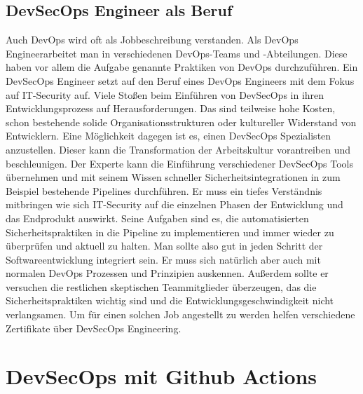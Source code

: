 \section{DevSecOps Engineer als Beruf}
Auch DevOps wird oft als Jobbeschreibung verstanden. Als \glqq DevOps Engineer\grqq arbeitet man in verschiedenen DevOps-Teams und -Abteilungen. Diese haben vor allem die Aufgabe genannte Praktiken von DevOps durchzuführen. \cite{dev-ops}
Ein DevSecOps Engineer setzt auf den Beruf eines DevOps Engineers mit dem Fokus auf IT-Security auf.
Viele Stoßen beim Einführen von DevSecOps in ihren Entwicklungsprozess auf Herausforderungen. Das sind teilweise hohe Kosten, schon bestehende solide Organisationsstrukturen oder kultureller Widerstand von Entwicklern. Eine Möglichkeit dagegen ist es, einen DevSecOps Spezialisten anzustellen. Dieser kann die Transformation der Arbeitskultur vorantreiben und beschleunigen. Der Experte kann die Einführung verschiedener DevSecOps Tools übernehmen und mit seinem Wissen schneller Sicherheitsintegrationen in zum Beispiel bestehende Pipelines durchführen. \cite{grey}
Er muss ein tiefes Verständnis mitbringen wie sich IT-Security auf die einzelnen Phasen der Entwicklung und das Endprodukt auswirkt. Seine Aufgaben sind es, die automatisierten Sicherheitspraktiken in die Pipeline zu implementieren und immer wieder zu überprüfen und aktuell zu halten. Man sollte also gut in jeden Schritt der Softwareentwicklung integriert sein. Er muss sich natürlich aber auch mit normalen DevOps Prozessen und Prinzipien auskennen. Außerdem sollte er versuchen die restlichen skeptischen Teammitglieder überzeugen, das die Sicherheitspraktiken wichtig sind und die Entwicklungsgeschwindigkeit nicht verlangsamen. Um für einen solchen Job angestellt zu werden helfen verschiedene Zertifikate über DevSecOps Engineering. \cite{Cobb2019-lq}

\chapter{DevSecOps mit Github Actions}

